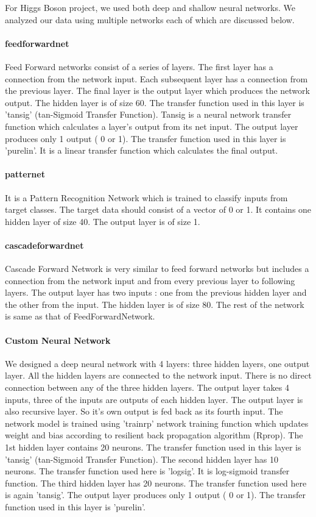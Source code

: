 For Higgs Boson project, we used both deep and shallow neural networks. We analyzed our data using multiple networks each of which are discussed below. 


\paragraph{feedforwardnet} Feed Forward networks consist of a series of layers. The first layer has a connection from the network input. Each subsequent layer has a connection from the previous layer. The final layer is the output layer which produces the network output. 
The hidden layer is of size 60. The transfer function used in this layer is 'tansig' (tan-Sigmoid Transfer Function). Tansig is a neural network transfer function which calculates a layer's output from its net input. The output layer produces only 1 output ( 0 or 1). The transfer function used in this layer is 'purelin'. It is a linear transfer function which calculates the final output.


\paragraph{patternet} It is a Pattern Recognition Network which is trained to classify inputs from target classes. The target data should consist of a vector of 0 or 1. It contains one hidden layer of size 40. The output layer is of size 1.


\paragraph{cascadeforwardnet}  Cascade Forward Network is very similar to feed forward networks but includes a connection from the network input and from every previous layer to following layers. The output layer has two inputs : one from the previous hidden layer and the other from the input. The hidden layer is of size 80. The rest of the network is same as that of FeedForwardNetwork.  


\paragraph{Custom Neural Network}  We designed a deep neural network with 4 layers: three hidden layers, one output layer. All the hidden layers are connected to the network input.  There is no direct connection between any of the three hidden layers. The output layer takes 4 inputs, three of the inputs are outputs of each hidden layer. The output layer is also recursive layer. So it's own output is fed back as its fourth input. The network model is trained using 'trainrp' network training function which updates weight and bias according to resilient back propagation algorithm (Rprop).
The 1st hidden layer contains 20 neurons. The transfer function used in this layer is 'tansig' (tan-Sigmoid Transfer Function). The second hidden layer has 10 neurons. The transfer function used here is 'logsig'. It is log-sigmoid transfer function. The third hidden layer has 20 neurons. The transfer function used here is again 'tansig'.  The output layer produces only 1 output ( 0 or 1). The transfer function used in this layer is 'purelin'.


